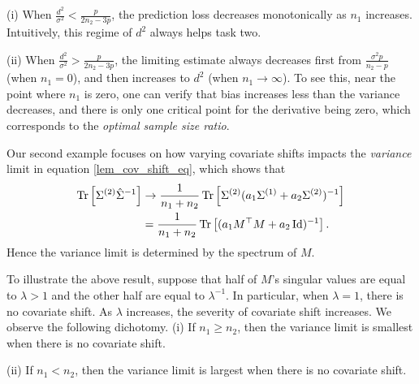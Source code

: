 (i) When $\frac{d^2}{\sigma^2} < \frac{p}{2n_2 - 3p}$, the prediction loss decreases monotonically as $n_1$ increases.
	Intuitively, this regime of $d^2$ always helps task two.

(ii) When $\frac{d^2}{\sigma^2} > \frac{p}{2n_2 - 3p}$, the limiting estimate always decreases first from $\frac{\sigma^2 p}{n_2 - p}$ (when $n_1 = 0$), and then increases to $d^2$ (when $n_1 \rightarrow \infty$).
	To see this, near the point where $n_1$ is zero, one can verify that bias increases less than the variance decreases, and there is only one critical point for the derivative being zero, which corresponds to the \textit{optimal sample size ratio}.

\begin{example}\label{ex_covshift}
Our second example focuses on how varying covariate shifts impacts the \textit{variance} limit in equation \eqref{lem_cov_shift_eq}, which shows that
\begin{align*}
	\operatorname{Tr}\left[\Sigma^{(2)} \hat{\Sigma}^{-1}\right] &\rightarrow \frac{1}{n_1 + n_2} \operatorname{Tr}\left[\Sigma^{(2)} (a_1 \Sigma^{(1)} + a_2 \Sigma^{(2)})^{-1}\right] \\
	&= \frac{1}{n_1 + n_2} \operatorname{Tr}\left[(a_1 M^{\top} M + a_2 \operatorname{Id})^{-1}\right].
\end{align*}
Hence the variance limit is determined by the spectrum of $M$.%

To illustrate the above result, suppose that half of $M$'s singular values are equal to $\lambda > 1$ and the other half are equal to $\lambda^{-1}$.
In particular, when $\lambda = 1$, there is no covariate shift.
As $\lambda$ increases, the severity of covariate shift increases.
We observe the following dichotomy.
(i) If $n_1 \ge n_2$, then the variance limit is smallest when there is no covariate shift.

(ii) If $n_1 < n_2$, then the variance limit is largest when there is no covariate shift.
\end{example}

